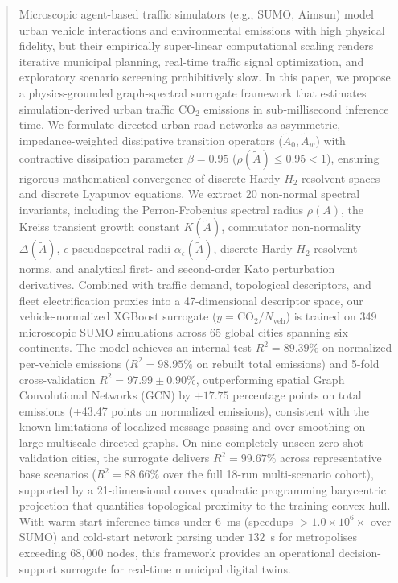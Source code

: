 \documentclass[journal]{IEEEtran}
\begin{document}
\begin{abstract}
Microscopic agent-based traffic simulators (e.g., SUMO, Aimsun) model urban vehicle interactions and environmental emissions with high physical fidelity, but their empirically super-linear computational scaling renders iterative municipal planning, real-time traffic signal optimization, and exploratory scenario screening prohibitively slow. In this paper, we propose a physics-grounded graph-spectral surrogate framework that estimates simulation-derived urban traffic $\text{CO}_2$ emissions in sub-millisecond inference time. We formulate directed urban road networks as asymmetric, impedance-weighted dissipative transition operators ($\tilde{A}_0, \tilde{A}_w$) with contractive dissipation parameter $\beta = 0.95$ ($\rho(\tilde{A}) \le 0.95 < 1$), ensuring rigorous mathematical convergence of discrete Hardy $H_2$ resolvent spaces and discrete Lyapunov equations. We extract 20 non-normal spectral invariants, including the Perron-Frobenius spectral radius $\rho(A)$, the Kreiss transient growth constant $K(\tilde{A})$, commutator non-normality $\Delta(\tilde{A})$, $\epsilon$-pseudospectral radii $\alpha_\epsilon(\tilde{A})$, discrete Hardy $H_2$ resolvent norms, and analytical first- and second-order Kato perturbation derivatives. Combined with traffic demand, topological descriptors, and fleet electrification proxies into a 47-dimensional descriptor space, our vehicle-normalized XGBoost surrogate ($y = \text{CO}_2 / N_{\text{veh}}$) is trained on 349 microscopic SUMO simulations across 65 global cities spanning six continents. The model achieves an internal test $R^2 = 89.39\%$ on normalized per-vehicle emissions ($R^2 = 98.95\%$ on rebuilt total emissions) and 5-fold cross-validation $R^2 = 97.99 \pm 0.90\%$, outperforming spatial Graph Convolutional Networks (GCN) by $+17.75$ percentage points on total emissions (+43.47 points on normalized emissions), consistent with the known limitations of localized message passing and over-smoothing on large multiscale directed graphs. On nine completely unseen zero-shot validation cities, the surrogate delivers $R^2 = 99.67\%$ across representative base scenarios ($R^2 = 88.66\%$ over the full 18-run multi-scenario cohort), supported by a 21-dimensional convex quadratic programming barycentric projection that quantifies topological proximity to the training convex hull. With warm-start inference times under $6$~ms (speedups $>1.0 \times 10^6 \times$ over SUMO) and cold-start network parsing under $132$~s for metropolises exceeding $68,000$ nodes, this framework provides an operational decision-support surrogate for real-time municipal digital twins.
\end{abstract}
\end{document}
